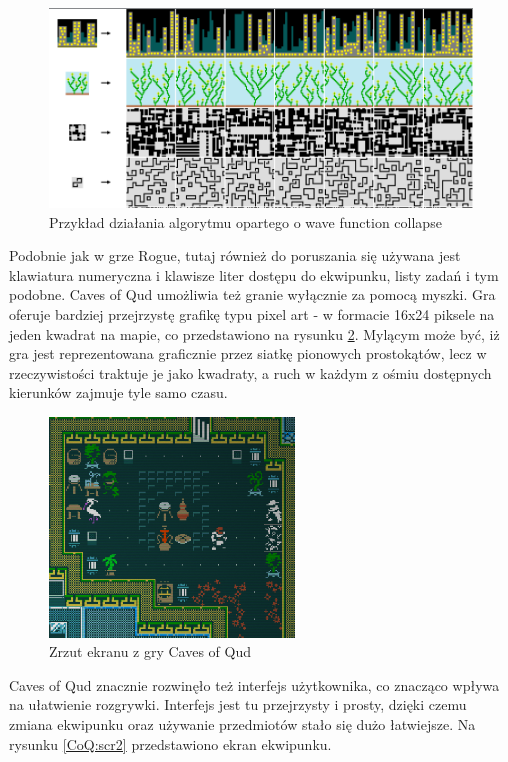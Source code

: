 \documentclass[12pt,twoside]{article}
\begin{document}
\FloatBarrier
\begin{figure}[h]
	\centering
	\includegraphics[width=12cm]{images/wfc.png}
	\caption{Przykład działania algorytmu opartego o wave function collapse}
	\label{wfc}
\end{figure}
\FloatBarrier


Podobnie jak w grze Rogue, tutaj również do poruszania się używana jest klawiatura numeryczna i klawisze liter dostępu do ekwipunku, listy zadań i tym podobne. Caves of Qud umożliwia też granie wyłącznie za pomocą myszki. Gra oferuje bardziej przejrzystę grafikę typu pixel art -  w formacie 16x24 piksele na jeden kwadrat na mapie, co przedstawiono na rysunku \ref{CoQ:scr3}. Mylącym może być, iż gra jest reprezentowana graficznie przez siatkę pionowych prostokątów, lecz w rzeczywistości traktuje je jako kwadraty, a ruch w każdym z ośmiu dostępnych kierunków zajmuje tyle samo czasu.

\FloatBarrier
\begin{figure}[h]
	\centering
	\includegraphics[width=65mm]{images/caves_of_qud/scr3.png}
	\caption{Zrzut ekranu z gry Caves of Qud}
	\label{CoQ:scr3}
\end{figure}
\FloatBarrier

Caves of Qud znacznie rozwinęło też interfejs użytkownika, co znacząco wpływa na ułatwienie rozgrywki. Interfejs jest tu przejrzysty i prosty, dzięki czemu zmiana ekwipunku oraz używanie przedmiotów stało się dużo łatwiejsze. Na rysunku \ref{CoQ:scr2} przedstawiono ekran ekwipunku.
\end{document}
